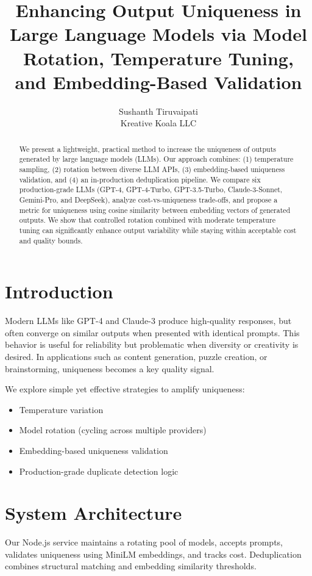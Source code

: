 \documentclass{article}
\title{Enhancing Output Uniqueness in Large Language Models via Model Rotation, Temperature Tuning, and Embedding-Based Validation}
\author{Sushanth Tiruvaipati \\ \small Kreative Koala LLC}
\date{}
\begin{document}
\maketitle

\begin{abstract}
We present a lightweight, practical method to increase the uniqueness of outputs generated by large language models (LLMs). Our approach combines: (1) temperature sampling, (2) rotation between diverse LLM APIs, (3) embedding-based uniqueness validation, and (4) an in-production deduplication pipeline. We compare six production-grade LLMs (GPT-4, GPT-4-Turbo, GPT-3.5-Turbo, Claude-3-Sonnet, Gemini-Pro, and DeepSeek), analyze cost-vs-uniqueness trade-offs, and propose a metric for uniqueness using cosine similarity between embedding vectors of generated outputs. We show that controlled rotation combined with moderate temperature tuning can significantly enhance output variability while staying within acceptable cost and quality bounds.
\end{abstract}

\section{Introduction}
Modern LLMs like GPT-4 and Claude-3 produce high-quality responses, but often converge on similar outputs when presented with identical prompts. This behavior is useful for reliability but problematic when diversity or creativity is desired. In applications such as content generation, puzzle creation, or brainstorming, uniqueness becomes a key quality signal.

We explore simple yet effective strategies to amplify uniqueness:
\begin{itemize}
  \item Temperature variation
  \item Model rotation (cycling across multiple providers)
  \item Embedding-based uniqueness validation
  \item Production-grade duplicate detection logic
\end{itemize}

\section{System Architecture}
Our Node.js service maintains a rotating pool of models, accepts prompts, validates uniqueness using MiniLM embeddings, and tracks cost. Deduplication combines structural matching and embedding similarity thresholds.
\end{document}
